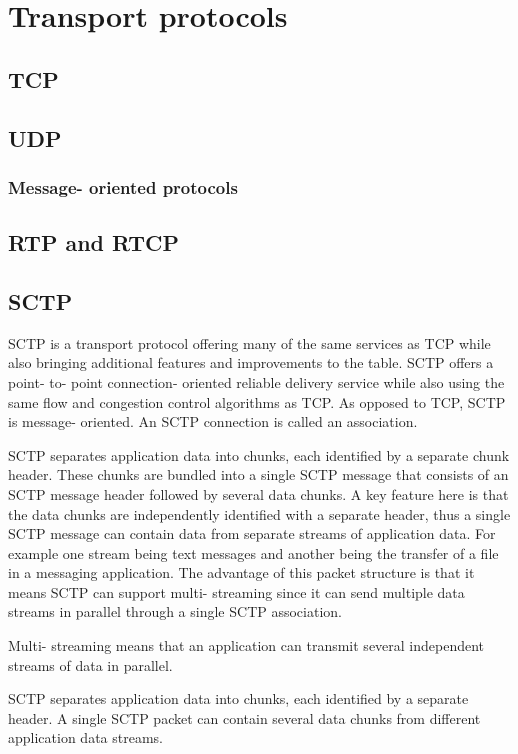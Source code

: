 \section{Transport protocols}
\subsection{TCP}
\subsection{UDP}
\subsubsection{Message- oriented protocols}
\subsection{RTP and RTCP}
\subsection{SCTP}
SCTP is a transport protocol offering many of the same services as TCP while also bringing additional features and improvements to the table. 
SCTP offers a point- to- point connection- oriented reliable delivery service while also using the same flow and congestion control algorithms as TCP.   %
As opposed to TCP, SCTP is message- oriented. %
An SCTP connection is called an association.

SCTP separates application data into chunks, each identified by a separate chunk header. 
These chunks are bundled into a single SCTP message that consists of an SCTP message header followed by several data chunks.
A key feature here is that the data chunks are independently identified with a separate header, thus a single SCTP message can contain data from separate streams of application data. For example one stream being text messages and another being the transfer of a file in a messaging application.
The advantage of this packet structure is that it means SCTP can support multi- streaming since it can send multiple data streams in parallel through a single SCTP association. 

Multi- streaming means that an application can transmit several independent streams of data in parallel. 

SCTP separates application data into chunks, each identified by a separate header. 
A single SCTP packet can contain several data chunks from different application data streams.

